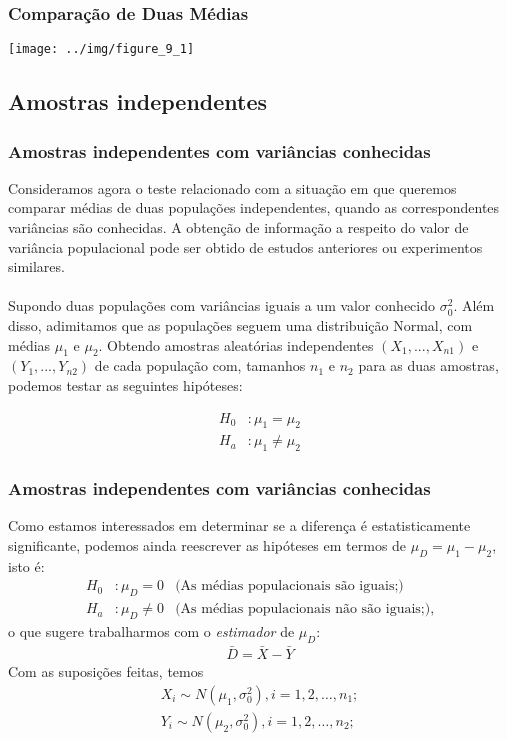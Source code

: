 \documentclass{beamer}
\begin{document}
\begin{frame}
\frametitle{Comparação de Duas Médias}

\begin{center}\texttt{[image: ../img/figure\_9\_1]} \end{center}
\end{frame}

\subsection{Amostras independentes}
\begin{frame}
\frametitle{Amostras independentes com variâncias conhecidas}

Consideramos agora o teste relacionado com a situação em que queremos comparar médias de duas populações independentes, quando as correspondentes variâncias são conhecidas. A obtenção de informação a respeito do valor de variância populacional pode ser obtido de estudos anteriores ou experimentos similares. \\~\\

Supondo duas populações com variâncias iguais a um valor conhecido \(\sigma^2_0\). Além disso, adimitamos que as populações seguem uma distribuição Normal, com médias \(\mu_1\) e \(\mu_2\). Obtendo amostras aleatórias independentes \((X_1, ..., X_{n1})\) e \((Y_1, ..., Y_{n2})\) de cada população com, tamanhos \(n_1\) e \(n_2\) para as duas amostras, podemos testar as seguintes hipóteses:

\begin{align*}
H_0 &: \mu_1 = \mu_2  \\
H_a &: \mu_1 \neq \mu_2
\end{align*}   


\end{frame}


\begin{frame}
\frametitle{Amostras independentes com variâncias conhecidas}

Como estamos interessados em determinar se a diferença é estatisticamente significante, podemos ainda reescrever as hipóteses em termos de \(\mu_D = \mu_1-\mu_2\), isto é: \begin{align*}
H_0 &: \mu_D = 0 & \text{(As médias populacionais são iguais;)} \\
H_a &: \mu_D \neq 0 & \text{(As médias populacionais não são iguais;),}
\end{align*}
o que sugere trabalharmos com o \textit{estimador} de \(\mu_D\):
\begin{align*}
\bar{D} = \bar{X}-\bar{Y}
\end{align*}
Com as suposições feitas, temos
\begin{align*}
X_i \sim N(\mu_1, \sigma^2_0), i = 1,2, \ldots, n_1; \\
Y_i \sim N(\mu_2, \sigma^2_0), i = 1,2, \ldots, n_2;
\end{align*}

\end{frame}
\end{document}
